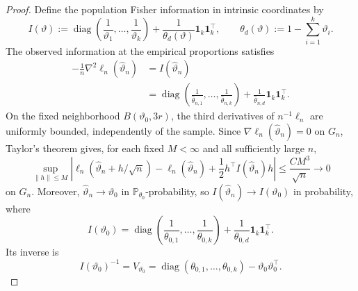 \documentclass{article}
\theoremstyle{named}
\theoremstyle{named1}
\theoremstyle{plain}
\theoremstyle{remark}
\begin{document}
\begin{proof}
Define the population Fisher information in intrinsic coordinates by
\[
    I(\vartheta)
    :=
    \operatorname{diag}\left(
        \frac1{\vartheta_1},\ldots,\frac1{\vartheta_k}
    \right)
    +\frac1{\theta_d(\vartheta)}\mathbf1_k\mathbf1_k^\top,
    \qquad
    \theta_d(\vartheta):=1-\sum_{i=1}^k\vartheta_i.
\]
The observed information at the empirical proportions satisfies
\begin{equation}
\begin{aligned}
    -\frac1n\nabla^2\ell_n(\widehat\vartheta_n)
    &=I(\widehat\vartheta_n)\\
    &=
    \operatorname{diag}\left(
        \frac1{\widehat\theta_{n,1}},\ldots,
        \frac1{\widehat\theta_{n,k}}
    \right)
    +\frac1{\widehat\theta_{n,d}}\mathbf1_k\mathbf1_k^\top.
\end{aligned}
    \label{eq:empirical-information}
\end{equation}
On the fixed neighborhood $B(\vartheta_0,3r)$, the third derivatives of
$n^{-1}\ell_n$ are uniformly bounded, independently of the sample.
Since $\nabla\ell_n(\widehat\vartheta_n)=0$ on $G_n$, Taylor's theorem
gives, for each fixed $M<\infty$ and all sufficiently large $n$,
\begin{equation}
    \sup_{\|h\|\leq M}
    \left|
        \ell_n(\widehat\vartheta_n+h/\sqrt n)
        -\ell_n(\widehat\vartheta_n)
        +\frac12h^\top I(\widehat\vartheta_n)h
    \right|
    \leq\frac{CM^3}{\sqrt n}
    \rightarrow0
    \label{eq:local-likelihood-expansion}
\end{equation}
on $G_n$. Moreover, $\widehat\vartheta_n\to\vartheta_0$ in
$\mathbb P_{\theta_0}$-probability, so
$I(\widehat\vartheta_n)\to I(\vartheta_0)$ in probability, where
\begin{equation}
    I(\vartheta_0)
    =
    \operatorname{diag}\left(
        \frac1{\theta_{0,1}},\ldots,\frac1{\theta_{0,k}}
    \right)
    +\frac1{\theta_{0,d}}\mathbf1_k\mathbf1_k^\top.
    \label{eq:fisher-information}
\end{equation}
Its inverse is
\begin{equation}
    I(\vartheta_0)^{-1}
    =V_{\vartheta_0}
    =\operatorname{diag}(\theta_{0,1},\ldots,\theta_{0,k})
     -\vartheta_0\vartheta_0^\top.
    \label{eq:inverse-information}
\end{equation}


\end{proof}
\end{document}
